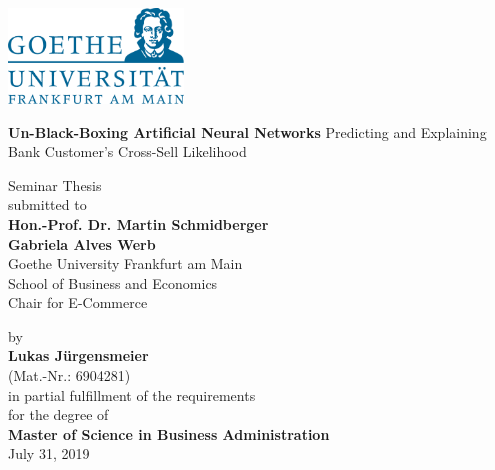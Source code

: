 \documentclass[12pt,a4paper]{article}
\begin{document}
\begin{center}
 \includegraphics[width=0.35\textwidth]{GU-Logo-blau-CMYK.eps} \vspace{2cm}
  
{\Large{\bf Un-Black-Boxing Artificial Neural Networks}} \newline
{\large{Predicting and Explaining Bank Customer's Cross-Sell Likelihood}} \vspace{0.5cm}


  Seminar Thesis \\\vspace{2cm}
  submitted to \\\vspace{0.5cm}
  \textbf{Hon.-Prof. Dr. Martin Schmidberger} \\
  \textbf{Gabriela Alves Werb} \\\vspace{0.5cm}
  Goethe University Frankfurt am Main \\
  School of Business and Economics \\
  Chair for E-Commerce \vspace{2cm}
  
  by \\\vspace{0.5cm}
  \textbf{Lukas J\"urgensmeier} \\
  (Mat.-Nr.: 6904281) \\
  
  \medskip
  \medskip
  in partial fulfillment of the requirements \\
  for the degree of \\\vspace{0.5cm}
  \textbf{Master of Science in Business Administration} \\\vspace{0.5cm}
  July 31, 2019
  
\end{center}
\end{document}
